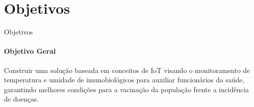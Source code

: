 \section{Objetivos}
\begin{frame}{Objetivos}
  \framesubtitle{\textcolor{fibeamer@black}{Objetivo Geral}}
  
  Construir uma solução baseada em conceitos de IoT visando o monitoramento de temperatura e umidade de imunobiológicos para auxiliar funcionários da saúde, garantindo melhores condições para a vacinação da população frente a incidência de doenças.
\end{frame}
